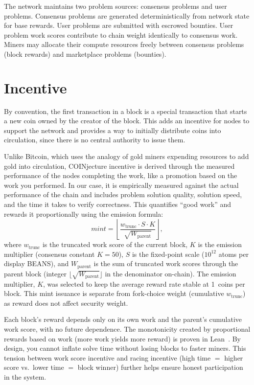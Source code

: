 \documentclass[12pt,letterpaper]{article}
\begin{document}
The network maintains two problem sources: consensus problems and user problems. Consensus problems
are generated deterministically from network state for base rewards. User problems are submitted with
escrowed bounties. User problem work scores contribute to chain weight identically to consensus work.
Miners may allocate their compute resources freely between consensus problems (block rewards) and
marketplace problems (bounties).

\section*{Incentive}

By convention, the first transaction in a block is a special transaction that starts a new coin owned by the
creator of the block. This adds an incentive for nodes to support the network and provides a way to
initially distribute coins into circulation, since there is no central authority to issue them.

Unlike Bitcoin, which uses the analogy of gold miners expending resources to add gold into circulation,
COINjecture incentive is derived through the measured performance of the nodes completing the work,
like a promotion based on the work you performed. In our case, it is empirically measured against the
actual performance of the chain and includes problem solution quality, solution speed, and the time it
takes to verify correctness. This quantifies ``good work'' and rewards it proportionally using the emission
formula:
\[
  \mathit{mint} = \left\lfloor \frac{w_{\mathrm{trunc}} \cdot S \cdot K}{\sqrt{W_{\mathrm{parent}}}} \right\rfloor,
\]
where $w_{\mathrm{trunc}}$ is the truncated work score of the current block, $K$ is the emission
multiplier (consensus constant $K=50$), $S$ is the fixed-point scale ($10^{12}$ atoms per display BEANS),
and $W_{\mathrm{parent}}$ is the sum of truncated work scores through the parent block (integer
$\lfloor\sqrt{W_{\mathrm{parent}}}\rfloor$ in the denominator on-chain). The emission multiplier, $K$, was 
selected to keep the average reward rate stable at 1~coins per block. This mint issuance is separate 
from fork-choice weight (cumulative $w_{\mathrm{trunc}}$) as reward does not affect security weight.

Each block's reward depends only on its own work and the parent's cumulative work score, with no future
dependence. The monotonicity created by proportional rewards based on work (more work yields more
reward) is proven in Lean~\cite{rewards_lean}. By design, you cannot inflate solve time without losing
blocks to faster miners. This tension between work score incentive and racing incentive (high time $=$
higher score vs.\ lower time $=$ block winner) further helps ensure honest participation in the system.
\end{document}
